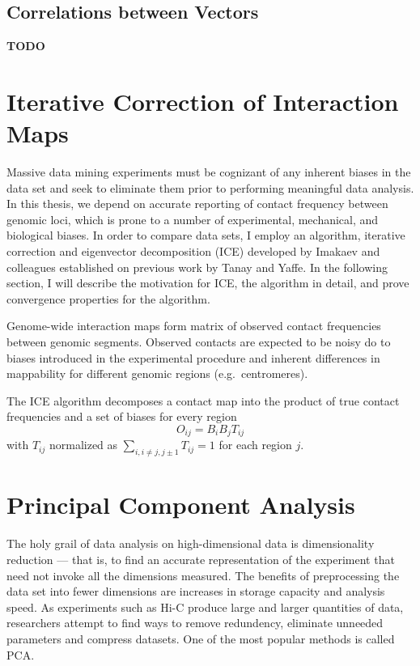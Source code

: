\subsection*{Correlations between Vectors}

\textbf{TODO}

\section*{Iterative Correction of Interaction Maps}

Massive data mining experiments must be cognizant of any inherent biases in the data set and seek to eliminate them prior to performing
meaningful data analysis.  In this thesis, we depend on accurate reporting of contact frequency between genomic loci, which is prone
to a number of experimental, mechanical, and biological biases\cite{dekker2006}.  In order to compare data sets, I employ an algorithm,
iterative correction and eigenvector decomposition (ICE) developed by Imakaev and colleagues\cite{imakaev2012} established on previous
work by Tanay and Yaffe\cite{yaffe2011}.  In the following section, I will describe the motivation for ICE, the algorithm in detail, and
prove convergence properties for the algorithm.

Genome-wide interaction maps form matrix of observed contact frequencies between genomic segments.  Observed contacts are expected to
be noisy do to biases introduced in the experimental procedure and inherent differences in mappability for different genomic regions
(e.g.\ centromeres).


The ICE algorithm decomposes a contact map into the product of true contact frequencies and a set of biases for every region
\[
  O_{ij} = B_{i}B_{j}T_{ij}
\]
with $T_{ij}$ normalized as $\sum_{i,i \neq j,j \pm 1}T_{ij} = 1$ for each region $j$.


\section*{Principal Component Analysis}

The holy grail of data analysis on high-dimensional data is dimensionality reduction --- that is, to find an accurate representation of
the experiment that need not invoke all the dimensions measured.  The benefits of preprocessing the data set into fewer dimensions are
increases in storage capacity and analysis speed.  As experiments such as Hi-C produce large and larger quantities of data, researchers
attempt to find ways to remove redundency, eliminate unneeded parameters and compress datasets.  One of the most popular methods is
called \gls{PCA}\cite{law1987}.

